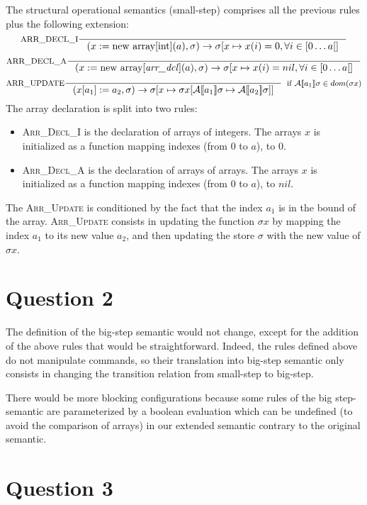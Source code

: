 \documentclass{article}
\begin{document}
The structural operational semantics (small-step) comprises all the previous rules plus the following extension:
\[
\inference[ARR\_DECL\_I]{}{(x := \text{new array[int]}(a), \sigma) \rightarrow
      \sigma[x \mapsto x(i) = 0, \forall i \in [0 \dots a[ ]}
\]
\[
\inference[ARR\_DECL\_A]{}{(x := \text{new array[} \text{\textit{arr\_dcl}]}(a), \sigma) \rightarrow
      \sigma[x \mapsto x(i) = nil, \forall i \in [0 \dots a[ ]}
\]
\[
\inference[ARR\_UPDATE]{}
    {(x[a_1] := a_2, \sigma) \rightarrow
     \sigma[x \mapsto \sigma x[\mathcal{A}\llbracket a_1 \rrbracket \sigma \mapsto \mathcal{A}\llbracket a_2 \rrbracket \sigma]]}
     [if \(\mathcal{A}\llbracket a_1\rrbracket \sigma \in dom(\sigma x)\)]
\]
The array declaration is split into two rules:
\begin{itemize}
 \item \textsc{Arr\_Decl\_I} is the declaration of arrays of integers. The arrays \(x\) is initialized as a function mapping indexes (from 0 to \(a\)), to 0.
 \item \textsc{Arr\_Decl\_A} is the declaration of arrays of arrays. The arrays \(x\) is initialized as a function mapping indexes (from 0 to \(a\)), to \(nil\).
\end{itemize}
The \textsc{Arr\_Update} is conditioned by the fact that the index \(a_1\) is in the bound of the array. \textsc{Arr\_Update} consists in updating the function \(\sigma x\) by mapping the index \(a_1\) to its new value \(a_2\), and then updating the store \(\sigma\) with the new value of \(\sigma x\).


\section*{Question 2}
The definition of the big-step semantic would not change, except for the addition of the above rules that would be straightforward.
Indeed, the rules defined above do not manipulate commands, so their translation into big-step semantic only consists in changing the transition relation from small-step to big-step.

There would be more blocking configurations because some rules of the big step-semantic are parameterized by a boolean evaluation which can be undefined (to avoid the comparison of arrays) in our extended semantic contrary to the original semantic.

\section*{Question 3}
\end{document}
